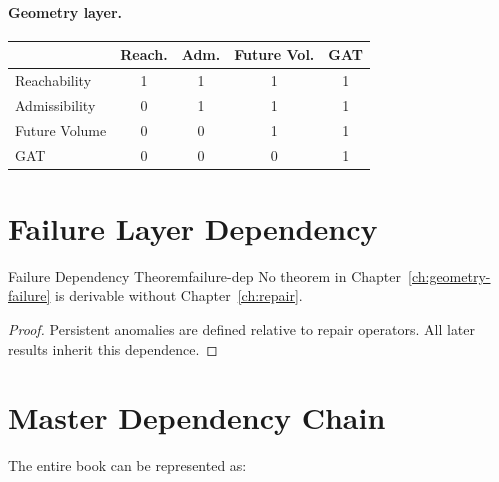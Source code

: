 \documentclass[12pt,twoside,openright]{book}
\begin{document}
\paragraph{Geometry layer.}
\begin{center}
\begin{tabular}{lcccc}
\toprule
& Reach. & Adm. & Future Vol. & GAT \\
\midrule
Reachability & 1&1&1&1 \\
Admissibility & 0&1&1&1 \\
Future Volume & 0&0&1&1 \\
GAT & 0&0&0&1 \\
\bottomrule
\end{tabular}
\end{center}

\section{Failure Layer Dependency}

\begin{theorem}{Failure Dependency Theorem}{failure-dep}
  No theorem in Chapter~\ref{ch:geometry-failure} is
  derivable without Chapter~\ref{ch:repair}.
\end{theorem}

\begin{proof}
  Persistent anomalies are defined relative to repair
  operators. All later results inherit this dependence.
\end{proof}

\section{Master Dependency Chain}

The entire book can be represented as:
\end{document}

